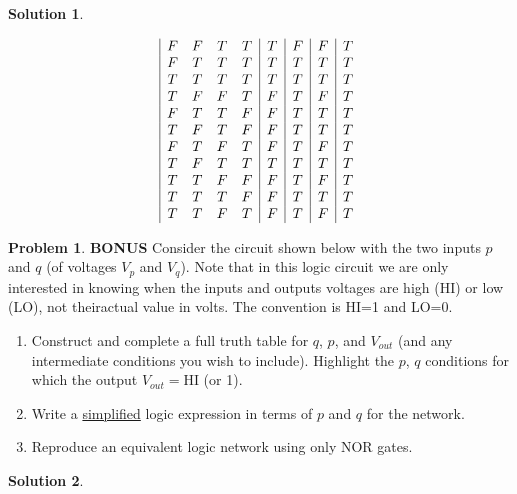 \documentclass[10pt]{article}
\theoremstyle{definition}
\newtheorem{problem}{Problem}
\newtheorem{soln}{Solution}
\begin{document}
\begin{soln}
\begin{enumerate}[label=(\alph*)]
\begin{displaymath}
\begin{array}{|c c c c|c|c|c|c}
              F & F & T & T & T  & F   & F      & T        \\
              F & T & T & T & T  & T   & T      & T        \\
              T & T & T & T & T  & T   & T      & T        \\
              T & F & F & T & F  & T   & F      & T        \\
              F & T & T & F & F  & T   & T      & T        \\
              T & F & T & F & F  & T   & T      & T        \\
              F & T & F & T & F  & T   & F      & T        \\
              T & F & T & T & T  & T   & T      & T        \\
              T & T & F & F & F  & T   & F      & T        \\
              T & T & T & F & F  & T   & T      & T        \\
              T & T & F & T & F  & T   & F      & T        \\
            \end{array}
          \end{displaymath}
  \end{enumerate}
\end{soln}
\newpage

\begin{problem}{\textbf{BONUS}}
Consider the circuit shown below with the two inputs $p$ and $q$ (of voltages $V_p$ and $V_q$). Note that in this logic circuit we are only interested in knowing when the inputs and outputs
voltages are high (HI) or low (LO), not theiractual value in volts. The convention is HI=1 and LO=0.
\begin{enumerate}[label=(\alph*)]
  \item Construct and complete a full truth table for $q$, $p$, and $V_{out}$ (and any intermediate conditions you wish to include). Highlight the $p$, $q$ conditions for which the output $V_{out}=$HI (or 1).
  \item Write a \underline{simplified} logic expression in terms of $p$ and $q$ for the network.
  \item Reproduce an equivalent logic network using only NOR gates.
\end{enumerate}
\end{problem}
\begin{soln} 
\end{soln}
\newpage
\end{document}
